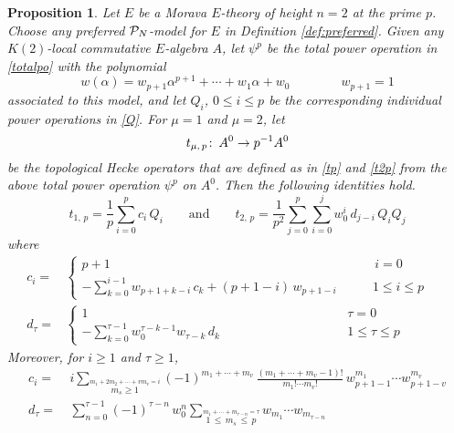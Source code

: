 \documentclass{gtpart}
\newtheorem{prop}[equation]{Proposition}
\theoremstyle{definition}
\theoremstyle{remark}
\def\co{\colon\thinspace}
\newcommand{\CP}{{\cal P}}
\newcommand{\ad}{\text{and}}
\newcommand{\A}{\alpha}
\newcommand{\T}{\tau}
\renewcommand{\=}{\approx}
\renewcommand{\-}{\sim}
\numberwithin{equation}{section}
\begin{document}
\begin{prop}
 \label{prop:Q}
 Let $E$ be a Morava $E$-theory of height $n = 2$ at the prime $p$.  Choose any 
 preferred $\CP_N$-model for $E$ in Definition \ref{def:preferred}.  Given any 
 $K(2)$-local commutative $E$-algebra $A$, let $\psi^p$ be the total power 
 operation in \eqref{totalpo} with the polynomial 
 \begin{equation}
  \label{wi}
  w(\A) = w_{p + 1} \A^{p + 1} + \cdots + w_1 \A + w_0 
  \qquad\qquad w_{p + 1} = 1 
 \end{equation}
 associated to this model, and let $Q_i$, $0 \leq i \leq p$ be the corresponding 
 individual power operations in \eqref{Q}.  For $\mu = 1$ and $\mu = 2$, let 
 \[
  t_{\mu,\,p} \co A^0 \to p^{-1} A^0 
 \]
 be the topological Hecke operators that are defined as in \eqref{tp} and 
 \eqref{t2p} from the above total power operation $\psi^p$ on $A^0$.  Then the 
 following identities hold.  
 \[
  t_{1,\,p} = \frac{1}{p} \sum_{i = 0}^p c_i \, Q_i \qquad \ad \qquad t_{2,\,p} 
  = \frac{1}{p^2} \sum_{j = 0}^p \sum_{i = 0}^j w_0^i \, d_{j - i} \, Q_i Q_j 
 \]
 where 
 \begin{equation*}
  \begin{split}
   c_i = & \left\{\!\!
   \begin{array}{ll}
    p + 1 & \qquad\, i = 0 \\
    -\sum_{k = 0}^{i - 1} w_{p + 1 + k - i} \, c_k + (p + 1 - i) \, 
    w_{p + 1 - i} & \qquad 1 \leq i \leq p 
   \end{array}
   \right.\\
   d_\T = & \left\{\!\!
   \begin{array}{ll}
    1 & \qquad\qquad\qquad\qquad\quad\, \T = 0 \\
    -\sum_{k = 0}^{\T - 1} w_0^{\T - k - 1} w_{\T - k} \, d_k & 
    \qquad\qquad\qquad\qquad\quad\, 1 \leq \T \leq p 
   \end{array}
   \right.\qquad\quad~\,
  \end{split}
 \end{equation*}
 Moreover, for $i \geq 1$ and $\T \geq 1$, 
 \begin{equation*}
  \begin{split}
    c_i = & ~ i \sum_{\stackrel{\scriptstyle m_1 + 2 m_2 + \cdots + v m_v = i}
            {m_s \geq 1}} (-1)^{m_1 + \cdots + m_v} \, 
            \frac{(m_1 + \cdots + m_v - 1)!}{m_1! \cdots m_v!} \, 
            w_{p + 1 - 1}^{m_1} \cdots w_{p + 1 - v}^{m_v} \\
   d_\T = & ~ \sum_{n = 0}^{\T - 1} (-1)^{\T - n} \, w_0^n 
            \sum_{\stackrel{\scriptstyle m_1 + \cdots + m_{\T - n} = \T}
            {1 \,\leq\, m_s \,\leq\, p}} w_{m_1} \cdots w_{m_{\T - n}} 
  \end{split}
 \end{equation*}
\end{prop}
\end{document}

